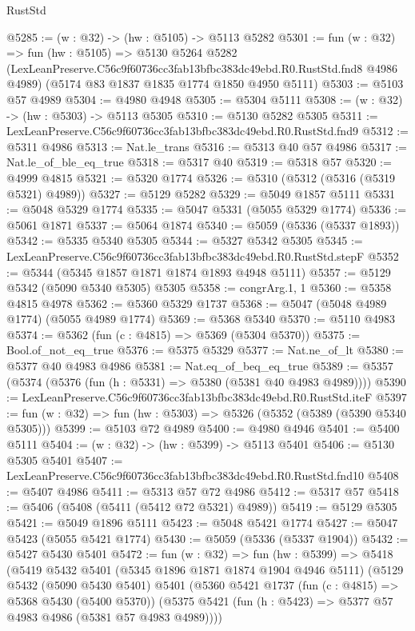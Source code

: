 \begin{lexlean}{RustStd}
\begin{coremodule}
@5285 := (w : @32) -> (hw : @5105) -> @5113 @5282
@5301 := fun (w : @32) =>
  fun (hw : @5105) =>
  @5130
    @5264
    @5282
    (LexLeanPreserve.C56c9f60736cc3fab13bfbc383dc49ebd.R0.RustStd.fnd8 @4986 @4989)
    (@5174 @83 @1837 @1835 @1774 @1850 @4950 @5111)
@5303 := @5103 @57 @4989
@5304 := @4980 @4948
@5305 := @5304 @5111
@5308 := (w : @32) -> (hw : @5303) -> @5113 @5305
@5310 := @5130 @5282 @5305
@5311 := LexLeanPreserve.C56c9f60736cc3fab13bfbc383dc49ebd.R0.RustStd.fnd9
@5312 := @5311 @4986
@5313 := Nat.le_trans
@5316 := @5313 @40 @57 @4986
@5317 := Nat.le_of_ble_eq_true
@5318 := @5317 @40
@5319 := @5318 @57
@5320 := @4999 @4815
@5321 := @5320 @1774
@5326 := @5310 (@5312 (@5316 (@5319 @5321) @4989))
@5327 := @5129 @5282
@5329 := @5049 @1857 @5111
@5331 := @5048 @5329 @1774
@5335 := @5047 @5331 (@5055 @5329 @1774)
@5336 := @5061 @1871
@5337 := @5064 @1874
@5340 := @5059 (@5336 (@5337 @1893))
@5342 := @5335 @5340 @5305
@5344 := @5327 @5342 @5305
@5345 := LexLeanPreserve.C56c9f60736cc3fab13bfbc383dc49ebd.R0.RustStd.stepF
@5352 := @5344 (@5345 @1857 @1871 @1874 @1893 @4948 @5111)
@5357 := @5129 @5342 (@5090 @5340 @5305) @5305
@5358 := congrArg.{1, 1}
@5360 := @5358 @4815 @4978
@5362 := @5360 @5329 @1737
@5368 := @5047 (@5048 @4989 @1774) (@5055 @4989 @1774)
@5369 := @5368 @5340
@5370 := @5110 @4983
@5374 := @5362 (fun (c : @4815) => @5369 (@5304 @5370))
@5375 := Bool.of_not_eq_true
@5376 := @5375 @5329
@5377 := Nat.ne_of_lt
@5380 := @5377 @40 @4983 @4986
@5381 := Nat.eq_of_beq_eq_true
@5389 := @5357 (@5374 (@5376 (fun (h : @5331) => @5380 (@5381 @40 @4983 @4989))))
@5390 := LexLeanPreserve.C56c9f60736cc3fab13bfbc383dc49ebd.R0.RustStd.iteF
@5397 := fun (w : @32) => fun (hw : @5303) => @5326 (@5352 (@5389 (@5390 @5340 @5305)))
@5399 := @5103 @72 @4989
@5400 := @4980 @4946
@5401 := @5400 @5111
@5404 := (w : @32) -> (hw : @5399) -> @5113 @5401
@5406 := @5130 @5305 @5401
@5407 := LexLeanPreserve.C56c9f60736cc3fab13bfbc383dc49ebd.R0.RustStd.fnd10
@5408 := @5407 @4986
@5411 := @5313 @57 @72 @4986
@5412 := @5317 @57
@5418 := @5406 (@5408 (@5411 (@5412 @72 @5321) @4989))
@5419 := @5129 @5305
@5421 := @5049 @1896 @5111
@5423 := @5048 @5421 @1774
@5427 := @5047 @5423 (@5055 @5421 @1774)
@5430 := @5059 (@5336 (@5337 @1904))
@5432 := @5427 @5430 @5401
@5472 := fun (w : @32) =>
  fun (hw : @5399) =>
  @5418
    (@5419
      @5432
      @5401
      (@5345 @1896 @1871 @1874 @1904 @4946 @5111)
      (@5129
        @5432
        (@5090 @5430 @5401)
        @5401
        (@5360
          @5421
          @1737
          (fun (c : @4815) => @5368 @5430 (@5400 @5370))
          (@5375 @5421 (fun (h : @5423) => @5377 @57 @4983 @4986 (@5381 @57 @4983 @4989))))

\end{coremodule}
\end{lexlean}
